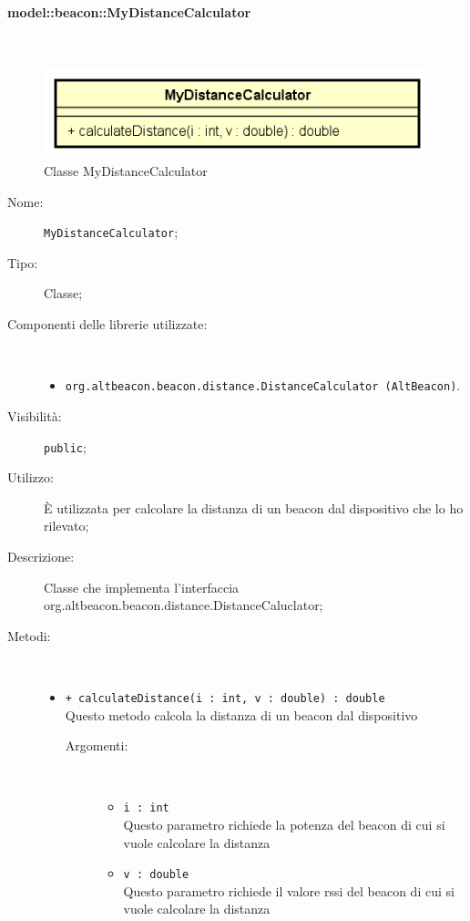 \documentclass[../DefinizioneDiProdotto.tex]{subfiles}
\begin{document}
\paragraph{model::beacon::MyDistanceCalculator}
\
\begin{figure}[H]
	\centering
	\includegraphics[width=\maxwidth]{img/MyDistanceCalculator.png}
	\caption{Classe MyDistanceCalculator}\label{fig:model::beacon::MyDistanceCalculator} 
\end{figure}
\begin{description}
	\item[Nome:] \texttt{MyDistanceCalculator};
	\item[Tipo:] Classe;
	\item[Componenti delle librerie utilizzate:] \
	\begin{itemize}
		\item \texttt{org.altbeacon.beacon.distance.DistanceCalculator (AltBeacon)}.
		
	\end{itemize}
	\item[Visibilità:] \texttt{public};
	\item[Utilizzo:] È utilizzata per calcolare la distanza di un beacon dal dispositivo che lo ho rilevato;
	\item[Descrizione:] Classe che implementa l'interfaccia org.altbeacon.beacon.distance.\-DistanceCaluclator;
	\item[Metodi:] \
	\begin{itemize}
		\item \texttt{+ calculateDistance(i : int, v : double) : double}\\
		Questo metodo calcola la distanza di un beacon dal dispositivo
		\begin{description}
			\item[Argomenti:] \
			\begin{itemize}
				\item \texttt{i : int}\\
				Questo parametro richiede la potenza del beacon di cui si vuole calcolare la distanza\item \texttt{v : double}\\
				Questo parametro richiede il valore rssi del beacon di cui si vuole calcolare la distanza\end{itemize}
		\end{description}
	\end{itemize}
\end{description}
\end{document}
